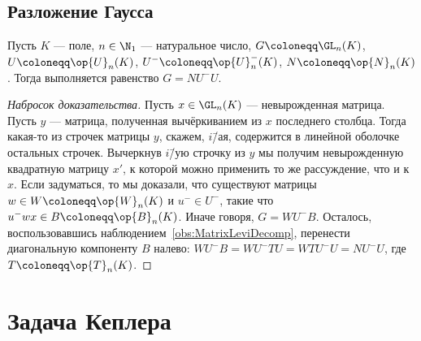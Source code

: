\documentclass[
	extrafontsizes,
	11pt,
	hyphens,
]{memoir}
\begin{document}
\subsection{Разложение Гаусса}

\begin{theorem}
Пусть \(K\) --- поле, \(n \in \N_1\) --- натуральное число,
\(G \coloneqq \GL_n(K)\), \(U \coloneqq \op{U}_n(K)\), \(U^{-} \coloneqq \op{U}^{-}_n(K)\), \(N \coloneqq \op{N}_n(K)\).
Тогда выполняется равенство \(G = N U^{-} U\).
\end{theorem}

\begin{proof}[Набросок доказательства]
Пусть \(x \in \GL_n(K)\) --- невырожденная матрица.
Пусть \(y\) --- матрица, полученная вычёркиванием из \(x\) последнего столбца.
Тогда какая-то из строчек матрицы \(y\), скажем, \(i\)\=/ая, содержится в линейной оболочке остальных строчек.
Вычеркнув \(i\)\=/ую строчку из \(y\) мы получим невырожденную квадратную матрицу \(x'\), к которой можно применить то же рассуждение, что и к \(x\).
Если задуматься, то мы доказали, что существуют матрицы \(w \in W \coloneqq \op{W}_n(K)\) и \(u^{-} \in U^{-}\), такие что \(u^{-} w x \in B \coloneqq \op{B}_n(K)\).
Иначе говоря, \(G = W U^{-} B\).
Осталось, воспользовавшись наблюдением~\ref{obs:MatrixLeviDecomp}, перенести диагональную компоненту \(B\) налево:
\(W U^{-} B = W U^{-} T U = W T U^{-} U = N U^{-} U\), где \(T \coloneqq \op{T}_n(K)\).
\end{proof}


\section{Задача Кеплера}


\end{document}
